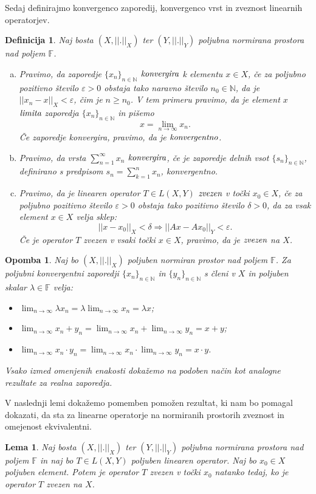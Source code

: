 \documentclass[12pt,a4paper,oneside,fleqn,openany]{book}
\newtheorem{lema}[izrek]{Lema}
\newtheorem{definicija}[izrek]{Definicija}
\newtheorem{opomba}[izrek]{Opomba}
\newcommand{\F}{\mathbb{F}}
\newcommand{\N}{\mathbb{N}}
\newcommand{\abs}[1]{\ensuremath{\lvert #1 \rvert}}
\newcommand{\norm}[1]{\abs{\abs{#1}}}
\newcommand{\pojem}[1]{\ensuremath{\emph{#1}}}
\begin{document}
Sedaj definirajmo konvergenco zaporedij, konvergenco vrst in zveznost linearnih operatorjev.
\begin{definicija}
	\label{zvop} Naj bosta $(X, \norm{.}_X)$ ter $(Y, \norm{.}_Y)$ poljubna normirana prostora nad poljem $\F$. 
	\begin{enumerate}[a)]
		\item Pravimo, da zaporedje $\{x_n\}_{n\in\N}$ \pojem{konvergira} k elementu $x\in X$, če za poljubno pozitivno število $\varepsilon>0$ obstaja tako naravno število $n_0\in\N$, da je $\norm{x_n - x}_X<\varepsilon$, čim je $n\geq n_0$. V tem primeru pravimo, da je element $x$ \pojem{limita} zaporedja $\{x_n\}_{n\in\N}$ in pišemo $$x = \lim_{n\to \infty}x_n.$$ Če zaporedje konvergira, pravimo, da je \pojem{konvergentno}.
		\item Pravimo, da vrsta $\sum_{n = 1}^\infty x_n$ \pojem{konvergira}, če je zaporedje delnih vsot $\{s_n\}_{n\in\N}$, definirano s predpisom $s_n=\sum_{k=1}^n x_n$, konvergentno.
		\item Pravimo, da je linearen operator $T\in L(X, Y)$ \pojem{zvezen} v točki $x_0\in X$, če za poljubno pozitivno število $\varepsilon>0$ obstaja tako pozitivno število $\delta>0$, da za vsak element $x\in X$ velja sklep: $$\norm{x-x_0}_X<\delta \Rightarrow \norm{Ax - Ax_0}_Y<\varepsilon.$$ Če je operator $T$ zvezen v vsaki točki $x\in X$, pravimo, da je \pojem{zvezen} na $X$.
	\end{enumerate}
\end{definicija}

\begin{opomba}
	\label{opomb:limitpravila}
	Naj bo $(X, \norm{.}_X)$ poljuben normiran prostor nad poljem $\F$. Za poljubni konvergentni zaporedji $\{x_n\}_{n\in\N}$ in $\{y_n\}_{n\in\N}$ s členi v $X$ in poljuben skalar $\lambda\in\F$ velja: \begin{itemize}
		\item $\lim_{n\to\infty}\lambda x_n = \lambda \lim_{n\to \infty}x_n = \lambda x$;
		\item $\lim_{n\to\infty}x_n + y_n = \lim_{n\to \infty}x_n + \lim_{n\to\infty}y_n= x + y$;
		\item $\lim_{n\to\infty}x_n\cdot y_n = \lim_{n\to \infty}x_n\cdot\lim_{n\to \infty}y_n = x\cdot y$.
	\end{itemize} Vsako izmed omenjenih enakosti dokažemo na podoben način kot analogne rezultate za realna zaporedja.
\end{opomba}
V naslednji lemi dokažemo pomemben pomožen rezultat, ki nam bo pomagal dokazati, da sta za linearne operatorje na normiranih prostorih zveznost in omejenost ekvivalentni.
\begin{lema}
	\label{lem:omopzv}
	Naj bosta $(X, \norm{.}_X)$ ter $(Y, \norm{.}_Y)$ poljubna normirana prostora nad poljem $\F$ in naj bo $T\in L(X, Y)$ poljuben linearen operator. Naj bo $x_0 \in X$ poljuben element. Potem je operator $T$ zvezen v točki $x_0$ natanko tedaj, ko je operator $T$ zvezen na $X$.
\end{lema}
\end{document}
